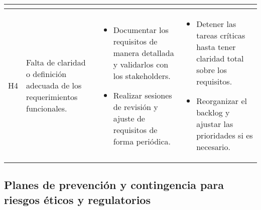 \begin{longtable}{|>{\centering\arraybackslash}p{0.7cm}|>{\raggedright\arraybackslash}p{4cm}|>{\raggedright\arraybackslash}p{5.5cm}|>{\raggedright\arraybackslash}p{5.5cm}|}
\begin{itemize}
	\end{itemize} \\
	\hline
	H4 & Falta de claridad o definición adecuada de los requerimientos funcionales. &
	\begin{itemize}
		\item Documentar los requisitos de manera detallada y validarlos con los stakeholders.
		\item Realizar sesiones de revisión y ajuste de requisitos de forma periódica.
	\end{itemize} &
	\begin{itemize}
		\item Detener las tareas críticas hasta tener claridad total sobre los requisitos.
		\item Reorganizar el backlog y ajustar las prioridades si es necesario.
	\end{itemize} \\
	\hline
\end{longtable}

\subsection{Planes de prevención y contingencia para riesgos éticos y regulatorios}

